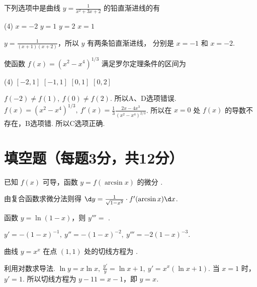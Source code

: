 \begin{problem}
  下列选项中是曲线 $y = \frac{1}{x^2 + 3x + 2}$ 的铅直渐进线的有
  \begin{tasks}(4)
    \task[\true] $x = -2$
    \task $y = 1$
    \task $y = 2$
    \task $x = 1$
  \end{tasks}
\end{problem}
\begin{solution}
  $y = \frac{1}{(x + 1)(x + 2)}$，所以 $y$ 有两条铅直渐进线，
  分别是 $x = -1$ 和 $x = -2$.
\end{solution}

\begin{problem}
  使函数 $f(x) = (x^2 - x^4)^{1/3}$ 满足罗尔定理条件的区间为
  \begin{tasks}(4)
    \task $[-2,1]$
    \task $[-1,1]$
    \task[\true] $[0,1]$
    \task $[0,2]$
  \end{tasks}
\end{problem}
\begin{solution}
  $f(-2) \neq f(1),~ f(0) \neq f(2)$. 所以A、D选项错误.
  $ f(x) = (x^2 - x^4)^{1/3},~
    f'(x) = \frac13\frac{2x - 4x^3}{(x^2 - x^4)^{2/3}}$.
  所以在 $x = 0$ 处 $f(x)$ 的导数不存在，B选项错. 所以C选项正确.
\end{solution}

\section{填空题（每题3分，共12分）}

\begin{problem}
  已知 $f(x)$ 可导，函数 $y = f(\arcsin x)$ 的微分
  .
\end{problem}
\begin{solution}
  由复合函数求微分法则得
  $\d y = \frac{1}{\sqrt{1 - x^2}} \cdot f'(\arcsin x) \d x$.
\end{solution}

\begin{problem}
  函数 $y = \ln(1 - x)$，则 $y''' = $ .
\end{problem}
\begin{solution}
  $y' = -(1 - x)^{-1},~ y'' = -(1 - x)^{-2},~ y''' = -2(1 - x)^{-3}$.
\end{solution}

\begin{problem}
  曲线 $y = x^x$ 在点 $(1,1)$ 处的切线方程为 .
\end{problem}
\begin{solution}
  利用对数求导法.
  $\ln y = x \ln x,~ \frac{y'}{y} = \ln x + 1,~ y' = x^x(\ln x + 1)$.
  当 $x = 1$ 时，$y' = 1$. 所以切线方程为 $y - 11 = x - 1$，即 $y = x$.
\end{solution}

